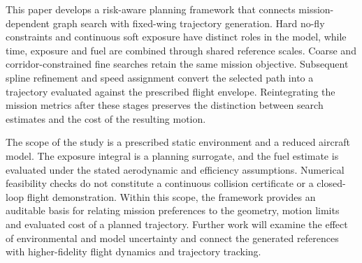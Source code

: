 \documentclass[preprint,12pt]{elsarticle}
\begin{document}
This paper develops a risk-aware planning framework that connects
mission-dependent graph search with fixed-wing trajectory generation.
Hard no-fly constraints and continuous soft exposure have distinct roles
in the model, while time, exposure and fuel are combined through shared
reference scales. Coarse and corridor-constrained fine searches retain
the same mission objective. Subsequent spline refinement and speed
assignment convert the selected path into a trajectory evaluated against
the prescribed flight envelope. Reintegrating the mission metrics after
these stages preserves the distinction between search estimates and the
cost of the resulting motion.


The scope of the study is a prescribed static environment and a reduced
aircraft model. The exposure integral is a planning surrogate, and the
fuel estimate is evaluated under the stated aerodynamic and efficiency
assumptions. Numerical feasibility checks do not constitute a continuous
collision certificate or a closed-loop flight demonstration. Within this
scope, the framework provides an auditable basis for relating mission
preferences to the geometry, motion limits and evaluated cost of a planned
trajectory. Further work will examine the effect of environmental and
model uncertainty and connect the generated references with higher-fidelity
flight dynamics and trajectory tracking.
\end{document}
